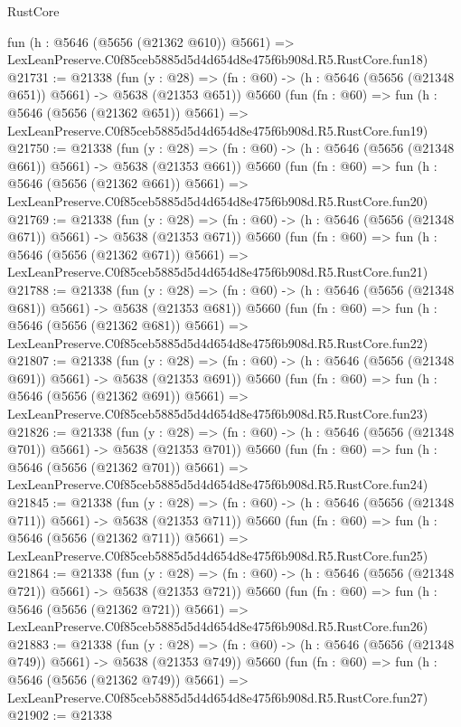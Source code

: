 \begin{lexlean}{RustCore}
\begin{coremodule}
    fun (h : @5646 (@5656 (@21362 @610)) @5661) =>
    LexLeanPreserve.C0f85ceb5885d5d4d654d8e475f6b908d.R5.RustCore.fun18)
@21731 := @21338
    (fun (y : @28) => (fn : @60) -> (h : @5646 (@5656 (@21348 @651)) @5661) -> @5638 (@21353 @651))
    @5660
    (fun (fn : @60) =>
    fun (h : @5646 (@5656 (@21362 @651)) @5661) =>
    LexLeanPreserve.C0f85ceb5885d5d4d654d8e475f6b908d.R5.RustCore.fun19)
@21750 := @21338
    (fun (y : @28) => (fn : @60) -> (h : @5646 (@5656 (@21348 @661)) @5661) -> @5638 (@21353 @661))
    @5660
    (fun (fn : @60) =>
    fun (h : @5646 (@5656 (@21362 @661)) @5661) =>
    LexLeanPreserve.C0f85ceb5885d5d4d654d8e475f6b908d.R5.RustCore.fun20)
@21769 := @21338
    (fun (y : @28) => (fn : @60) -> (h : @5646 (@5656 (@21348 @671)) @5661) -> @5638 (@21353 @671))
    @5660
    (fun (fn : @60) =>
    fun (h : @5646 (@5656 (@21362 @671)) @5661) =>
    LexLeanPreserve.C0f85ceb5885d5d4d654d8e475f6b908d.R5.RustCore.fun21)
@21788 := @21338
    (fun (y : @28) => (fn : @60) -> (h : @5646 (@5656 (@21348 @681)) @5661) -> @5638 (@21353 @681))
    @5660
    (fun (fn : @60) =>
    fun (h : @5646 (@5656 (@21362 @681)) @5661) =>
    LexLeanPreserve.C0f85ceb5885d5d4d654d8e475f6b908d.R5.RustCore.fun22)
@21807 := @21338
    (fun (y : @28) => (fn : @60) -> (h : @5646 (@5656 (@21348 @691)) @5661) -> @5638 (@21353 @691))
    @5660
    (fun (fn : @60) =>
    fun (h : @5646 (@5656 (@21362 @691)) @5661) =>
    LexLeanPreserve.C0f85ceb5885d5d4d654d8e475f6b908d.R5.RustCore.fun23)
@21826 := @21338
    (fun (y : @28) => (fn : @60) -> (h : @5646 (@5656 (@21348 @701)) @5661) -> @5638 (@21353 @701))
    @5660
    (fun (fn : @60) =>
    fun (h : @5646 (@5656 (@21362 @701)) @5661) =>
    LexLeanPreserve.C0f85ceb5885d5d4d654d8e475f6b908d.R5.RustCore.fun24)
@21845 := @21338
    (fun (y : @28) => (fn : @60) -> (h : @5646 (@5656 (@21348 @711)) @5661) -> @5638 (@21353 @711))
    @5660
    (fun (fn : @60) =>
    fun (h : @5646 (@5656 (@21362 @711)) @5661) =>
    LexLeanPreserve.C0f85ceb5885d5d4d654d8e475f6b908d.R5.RustCore.fun25)
@21864 := @21338
    (fun (y : @28) => (fn : @60) -> (h : @5646 (@5656 (@21348 @721)) @5661) -> @5638 (@21353 @721))
    @5660
    (fun (fn : @60) =>
    fun (h : @5646 (@5656 (@21362 @721)) @5661) =>
    LexLeanPreserve.C0f85ceb5885d5d4d654d8e475f6b908d.R5.RustCore.fun26)
@21883 := @21338
    (fun (y : @28) => (fn : @60) -> (h : @5646 (@5656 (@21348 @749)) @5661) -> @5638 (@21353 @749))
    @5660
    (fun (fn : @60) =>
    fun (h : @5646 (@5656 (@21362 @749)) @5661) =>
    LexLeanPreserve.C0f85ceb5885d5d4d654d8e475f6b908d.R5.RustCore.fun27)
@21902 := @21338

\end{coremodule}
\end{lexlean}
